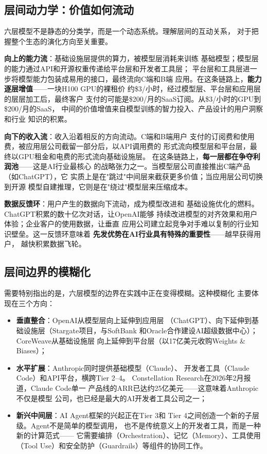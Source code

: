 \subsection{层间动力学：价值如何流动}

六层模型不是静态的分类学，而是一个动态系统。理解层间的互动关系，
对于把握整个生态的演化方向至关重要。

\textbf{向上的能力流}：基础设施层提供的算力，被模型层消耗来训练
基础模型；模型层的能力通过API和开源权重传递给平台层和开发者工具层；
平台层和工具层进一步将模型能力包装成易用的接口，最终流向C端和B端
应用。在这条链路上，\textbf{能力逐层增值}——一块H100 GPU的裸租价
约\$3/小时，经过模型层、平台层和应用层的层层加工后，最终客户
支付的可能是\$200/月的SaaS订阅。从\$3/小时的GPU到\$200/月的SaaS，
中间的价值增值来自模型训练的智力投入、产品设计的用户洞察和行业
知识的积累。

\textbf{向下的收入流}：收入沿着相反的方向流动。C端和B端用户
支付的订阅费和使用费，被应用层公司截留一部分后，以API调用费的
形式流向模型层和平台层，最终以GPU租金和电费的形式流向基础设施层。
在这条链路上，\textbf{每一层都在争夺利润池}——这是AI行业最核心
的战略张力之一。当模型层公司直接推出C端产品（如ChatGPT），它
实质上是在"跳过"中间层来截获更多价值；当应用层公司切换到开源
模型自建推理，它则是在"绕过"模型层来压缩成本。

\textbf{数据反馈环}：用户产生的数据向下流动，成为模型改进和
基础设施优化的燃料。ChatGPT积累的数十亿次对话，让OpenAI能够
持续改进模型的对齐效果和用户体验；企业客户的使用数据，让垂直
应用公司建立起竞争对手难以复制的行业知识壁垒。这一反馈环意味着
\textbf{先发优势在AI行业具有特殊的重要性}——越早获得用户，
越快积累数据飞轮。

\subsection{层间边界的模糊化}

需要特别指出的是，六层模型的边界在实践中正在变得模糊。这种模糊化
主要体现在三个方向：

\begin{itemize}
  \item \textbf{垂直整合}：OpenAI从模型层向上延伸到应用层
    （ChatGPT）、向下延伸到基础设施层（Stargate项目，与SoftBank
    和Oracle合作建设AI超级数据中心）；CoreWeave从基础设施层
    向上延伸到平台层（以17亿美元收购Weights \& Biases）；
  \item \textbf{水平扩展}：Anthropic同时提供基础模型（Claude）、
    开发者工具（Claude Code）和API平台，横跨Tier 2--4。
    Constellation Research在2026年2月报道，Claude Code单一
    产品线的ARR已达约25亿美元——这意味着Anthropic不仅是模型
    公司，也已经是最大的AI开发者工具公司之一；
  \item \textbf{新兴中间层}：AI Agent框架的兴起正在Tier 3和
    Tier 4之间创造一个新的子层级。Agent不是简单的模型调用，
    也不是传统意义上的开发者工具，而是一种新的计算范式——
    它需要编排（Orchestration）、记忆（Memory）、工具使用
    （Tool Use）和安全防护（Guardrails）等组件的协同工作。
\end{itemize}


